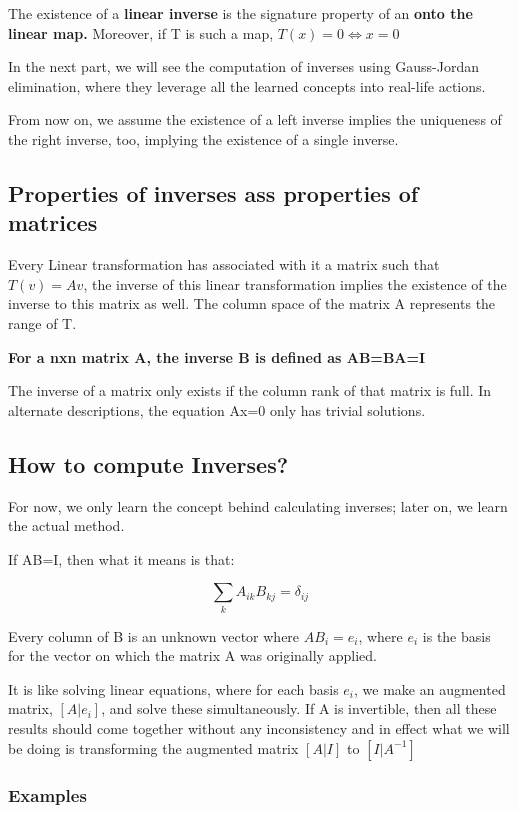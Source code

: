 The existence of a \textbf{ linear inverse} is the signature property of an \textbf{onto the linear map.} Moreover, if T is such a map, $T(x)=0 \iff x=0$

In the next part, we will see the computation of inverses using Gauss-Jordan elimination, where they leverage all the learned concepts into real-life actions. 

From now on, we assume the existence of a left inverse implies the uniqueness of the right inverse, too, implying the existence of a single inverse. 

\subsection{Properties of inverses ass properties of matrices}

Every Linear transformation has associated with it a matrix such that $T(v)=Av$, the inverse of this linear transformation implies the existence of the inverse to this matrix as well. The column space of the matrix A represents the range of T.

\textbf{For a nxn matrix A, the inverse B is defined as AB=BA=I}

The inverse of a matrix only exists if the column rank of that matrix is full. In alternate descriptions, the equation Ax=0 only has trivial solutions. 

\subsection{How to compute Inverses?}

For now, we only learn the concept behind calculating inverses; later on, we learn the actual method. 

If AB=I, then what it means is that:

$$\sum_k A_{ik}B_{kj}=\delta_{ij}$$

Every column of B is an unknown vector where $AB_i=e_i$, where $e_i$ is the basis for the vector on which the matrix A was originally applied. 

It is like solving linear equations, where for each basis $e_i$, we make an augmented matrix, $[A|e_i]$, and solve these simultaneously. If A is invertible, then all these results should come together without any inconsistency and in effect what we will be doing is transforming the augmented matrix $[A|I]$ to $[I| A^{-1}]$

\subsubsection{Examples}

